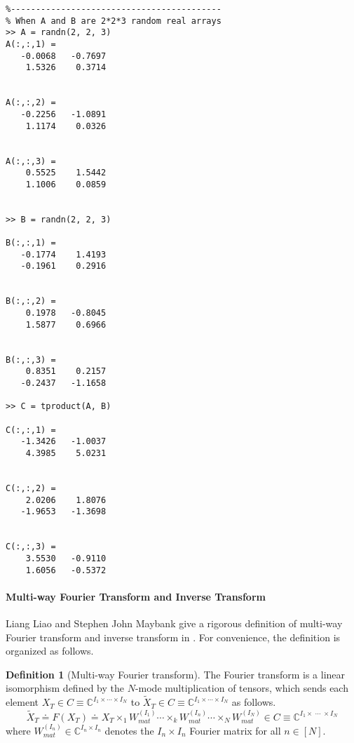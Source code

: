 \documentclass[12pt,reqno]{amsart}
\numberwithin{equation}{section}
\numberwithin{figure}{section}
\numberwithin{table}{section}
\theoremstyle{definition}
\newtheorem{definition}[theorem]{Definition}
\begin{document}
\begin{verbatim}
%------------------------------------------
% When A and B are 2*2*3 random real arrays
>> A = randn(2, 2, 3)
A(:,:,1) =
   -0.0068   -0.7697
    1.5326    0.3714


A(:,:,2) =
   -0.2256   -1.0891
    1.1174    0.0326


A(:,:,3) =
    0.5525    1.5442
    1.1006    0.0859
    
    
>> B = randn(2, 2, 3)

B(:,:,1) = 
   -0.1774    1.4193
   -0.1961    0.2916


B(:,:,2) = 
    0.1978   -0.8045
    1.5877    0.6966


B(:,:,3) = 
    0.8351    0.2157
   -0.2437   -1.1658

>> C = tproduct(A, B)

C(:,:,1) = 
   -1.3426   -1.0037
    4.3985    5.0231


C(:,:,2) = 
    2.0206    1.8076
   -1.9653   -1.3698


C(:,:,3) = 
    3.5530   -0.9110
    1.6056   -0.5372

\end{verbatim}    










\paragraph{\color{blue}\sc Multi-way Fourier Transform and Inverse Transform}

Liang Liao and Stephen John Maybank give a rigorous definition of multi-way Fourier transform and inverse transform in \cite{liao2020general,liao2020generalized}. 
For convenience, the definition is organized as follows. 

\begin{definition}[\sc Multi-way Fourier transform]
The Fourier transform is a linear isomorphism 
defined by the $N$-mode multiplication of tensors, which sends each element $X_\mathit{T} \in C \equiv \mathbb{C}^{I_1\times \cdots \times I_N}$  to $\tilde{X}_\mathit{T} \in C \equiv \mathbb{C}^{I_1\times \cdots \times I_N}$ as follows. 
\begin{equation}
\tilde{X}_\mathit{T} \doteq  
F(X_\mathit{T}) \doteq  X_\mathit{T} \times_1 W_\mathit{mat}^{(I_1)} \cdots \times_k W_\mathit{mat}^{(I_n)} 
\cdots \times_N W_\mathit{mat}^{(I_N)} \in 
C \equiv 
\mathbb{C}^{I_1\times \;\cdots\; \times I_N}
\label{equation:fourier-transform-tscalar}
\end{equation}
where $W_\mathit{mat}^{(I_n)} \in \mathbb{C}^{I_n\times I_n} $ denotes the $I_n\times I_n$ 
Fourier matrix  for all $n \in [N]$. 
\end{definition}
\end{document}
